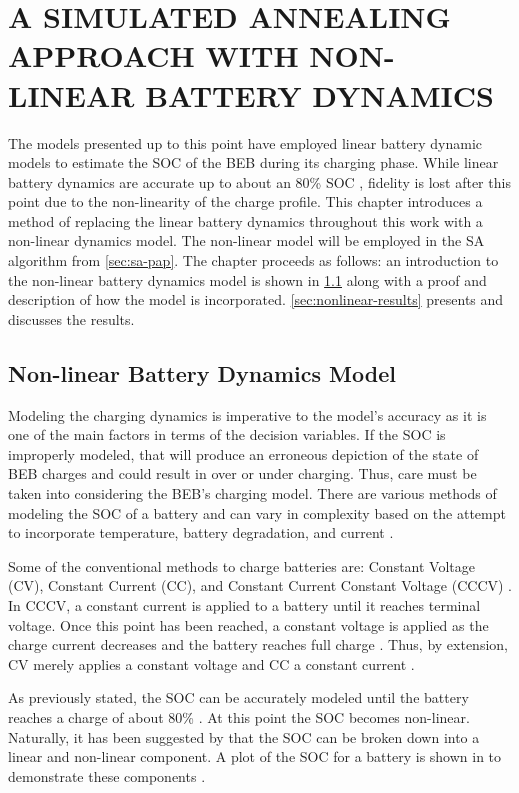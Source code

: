 \documentclass[ee,thesis]{usuthesis}
\begin{document}
\chapter{A SIMULATED ANNEALING APPROACH WITH NON-LINEAR BATTERY DYNAMICS}
\label{sec:nonlinear-battery-dynamics}
The models presented up to this point have employed linear battery dynamic models to estimate the SOC of the BEB during
its charging phase. While linear battery dynamics are accurate up to about an 80\% SOC \cite{liu-2020-batter-elect},
fidelity is lost after this point due to the non-linearity of the charge profile. This chapter introduces a method of
replacing the linear battery dynamics throughout this work with a non-linear dynamics model. The non-linear model will
be employed in the SA algorithm from \ref{sec:sa-pap}. The chapter proceeds as follows: an introduction to the non-linear
battery dynamics model is shown in \ref{sec:nonlinear-model} along with a proof and description of how the model is
incorporated. \ref{sec:nonlinear-results} presents and discusses the results.

\section{Non-linear Battery Dynamics Model}
\label{sec:nonlinear-model}
Modeling the charging dynamics is imperative to the model's accuracy as it is one of the main factors in terms of the
decision variables. If the SOC is improperly modeled, that will produce an erroneous depiction of the state of BEB
charges and could result in over or under charging. Thus, care must be taken into considering the BEB's charging model.
There are various methods of modeling the SOC of a battery and can vary in complexity based on the attempt to
incorporate temperature, battery degradation, and current
\cite{zhang-2021-optim-elect,chen-2008-desig-grey,watrin-2012-multip-lithium}.

Some of the conventional methods to charge batteries are: Constant Voltage (CV), Constant Current (CC), and Constant
Current Constant Voltage (CCCV) \cite{arabsalmanabadi-2018-charg-techn}. In CCCV, a constant current is applied to a
battery until it reaches terminal voltage. Once this point has been reached, a constant voltage is applied as the charge
current decreases and the battery reaches full charge \cite{chen-2008-desig-grey}. Thus, by extension, CV merely
applies a constant voltage and CC a constant current \cite{arabsalmanabadi-2018-charg-techn}.

As previously stated, the SOC can be accurately modeled until the battery reaches a charge of about 80\%
\cite{liu-2020-batter-elect}. At this point the SOC becomes non-linear. Naturally, it has been suggested by
\cite{zhang-2021-optim-elect} that the SOC can be broken down into a linear and non-linear component. A plot of the SOC
for a battery is shown in to demonstrate these components \cite{zhang-2021-optim-elect}.
\end{document}
